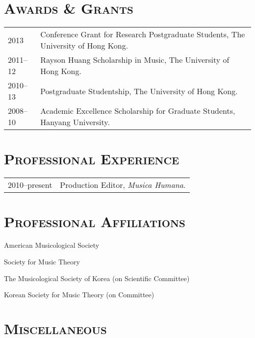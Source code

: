 \documentclass[a4paper,11pt]{article}
\begin{document}
  \vspace{2.5mm}
  
  \section*{\textsc{Awards \& Grants}}
  
  \hspace*{-0.25cm}
  \begin{tabular}{p{2.5cm} l}
    2013 & Conference Grant for Research Postgraduate Students, The University
    of Hong Kong.\\
    
    2011–12 & Rayson Huang Scholarship in Music, The University of Hong Kong.\\
    
    2010–13 & Postgraduate Studentship, The University of Hong Kong.\\
    
    2008–10 & Academic Excellence Scholarship for Graduate Students, Hanyang
    University.
  \end{tabular}
  
  \vspace{2.5mm}
  
  \section*{\textsc{Professional Experience}}
  
  \hspace*{-0.25cm}
  \begin{tabular}{p{2.5cm} l}
    2010--present & Production Editor, \textit{Musica Humana}.
  \end{tabular}
  
  \vspace{2.5mm}
  
  \section*{\textsc{Professional Affiliations}}
  
  American Musicological Society
  
  \noindent Society for Music Theory
  
  \noindent The Musicological Society of Korea (on Scientific Committee)
  
  \noindent Korean Society for Music Theory (on Committee)
  
  \section*{\textsc{Miscellaneous}}
  
\end{document}
